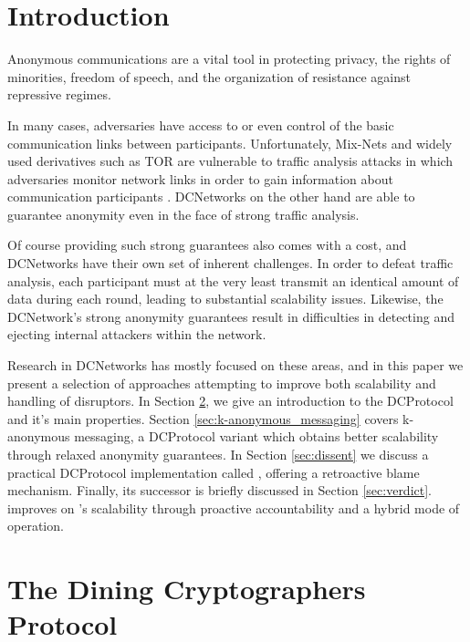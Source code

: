 \section{Introduction}

Anonymous communications are a vital tool in protecting privacy, the rights of minorities,
freedom of speech, and the organization of resistance against repressive regimes.

In many cases, adversaries have access to or even control of the basic communication
links between participants. Unfortunately, Mix-Nets \cite{journals/cacm/Chaum81} and 
widely used derivatives such as TOR \cite{conf/uss/DingledineMS04} are vulnerable to traffic
analysis attacks in which adversaries monitor network links in order to gain information
about communication participants \cite{murdoch2005low}. \acp{DCNetwork} on the other hand
are able to guarantee anonymity even in the face of strong traffic analysis.

Of course providing such strong guarantees also comes with a cost, and \acp{DCNetwork}
have their own set of inherent challenges. In order to defeat traffic analysis,
each participant must at the very least transmit an identical amount of data during each round,
leading to substantial scalability issues. Likewise, the \ac{DCNetwork}'s strong anonymity guarantees result
in difficulties in detecting and ejecting internal attackers within the network.

Research in \acp{DCNetwork} has mostly focused on these areas, and in this paper we
present a selection of approaches attempting to improve both scalability and handling of disruptors.
In Section \ref{sec:dining_cryptographers_protocol}, we give an introduction
to the \ac{DCProtocol} and it's main properties. Section \ref{sec:k-anonymous_messaging} 
covers k-anonymous messaging, a \ac{DCProtocol} variant which obtains better scalability
through relaxed anonymity guarantees. In Section \ref{sec:dissent} we discuss a practical
\ac{DCProtocol} implementation called \Dissent, offering a retroactive blame mechanism.
Finally, its successor \Verdict is briefly discussed in Section \ref{sec:verdict}. \Verdict
improves on \Dissent's scalability through proactive accountability and a hybrid mode of operation.

\section{The Dining Cryptographers Protocol} \label{sec:dining_cryptographers_protocol}

